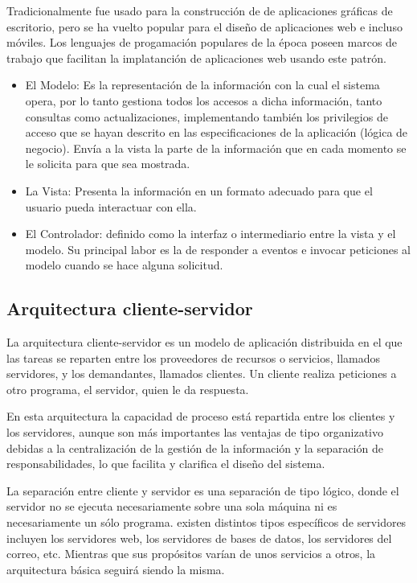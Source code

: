 Tradicionalmente fue usado para la construcción de de aplicaciones gráficas de escritorio, pero se ha vuelto popular para el diseño de aplicaciones web e incluso móviles. Los lenguajes de progamación populares de la época poseen marcos de trabajo que facilitan la implatanción de aplicaciones web usando este patrón.

\begin{itemize}

\item El Modelo: Es la representación de la información con la cual el sistema opera, por lo tanto gestiona todos los accesos a dicha información, tanto consultas como actualizaciones, implementando también los privilegios de acceso que se hayan descrito en las especificaciones de la aplicación (lógica de negocio). Envía a la vista la parte de la información que en cada momento se le solicita para que sea mostrada.

\item La Vista: Presenta la información en un formato adecuado para que el usuario pueda interactuar con ella.

\item El Controlador: definido como la interfaz o intermediario entre la vista y el modelo. Su principal labor es la de responder a eventos e invocar peticiones al modelo cuando se hace alguna solicitud. 

\end{itemize}

\subsection{Arquitectura cliente-servidor}

La arquitectura cliente-servidor es un modelo de aplicación distribuida en el que las tareas se reparten entre los proveedores de recursos o servicios, llamados servidores, y los demandantes, llamados clientes. Un cliente realiza peticiones a otro programa, el servidor, quien le da respuesta.

En esta arquitectura la capacidad de proceso está repartida entre los clientes y los servidores, aunque son más importantes las ventajas de tipo organizativo debidas a la centralización de la gestión de la información y la separación de responsabilidades, lo que facilita y clarifica el diseño del sistema.

La separación entre cliente y servidor es una separación de tipo lógico, donde el servidor no se ejecuta necesariamente sobre una sola máquina ni es necesariamente un sólo programa. existen distintos tipos específicos de servidores incluyen los servidores web, los servidores de bases de datos, los servidores del correo, etc. Mientras que sus propósitos varían de unos servicios a otros, la arquitectura básica seguirá siendo la misma.

